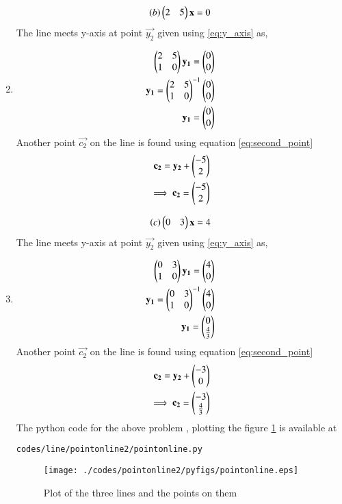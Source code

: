 \begin{enumerate}[label=\thesection.\arabic*.,ref=\thesection.\theenumi]
\begin{align}
\left(b\right)\begin{pmatrix}2&5\end{pmatrix}\mathbf{x}=0
\end{align}
The line meets y-axis at point $\vec{y_2}$ given using \ref{eq:y_axis} as,
\item 
\begin{align}
\begin{pmatrix}2&5\\1&0\end{pmatrix}\mathbf{y_1} =\begin{pmatrix}0\\0\end{pmatrix}
\\
\mathbf{y_1}={\begin{pmatrix}2&5\\1&0\end{pmatrix}}^{-1}\begin{pmatrix}0\\0\end{pmatrix}
\\
\mathbf{y_1}=\begin{pmatrix}0\\0\end{pmatrix}
\end{align}
Another point $\vec{c_2}$ on the line is found using equation \ref{eq:second_point}
\begin{align}
\mathbf{c_2} = \mathbf{y_2} + \begin{pmatrix}-5\\2\end{pmatrix}
\\
\implies \mathbf{c_2} = \begin{pmatrix}-5\\2\end{pmatrix}
\end{align}

\begin{align}
\left(c\right)\begin{pmatrix}0&3\end{pmatrix}\mathbf{x}=4
\end{align}
The line meets y-axis at point $\vec{y_2}$ given using \ref{eq:y_axis} as,
\item 
\begin{align}
\begin{pmatrix}0&3\\1&0\end{pmatrix}\mathbf{y_1} =\begin{pmatrix}4\\0\end{pmatrix}
\\
\mathbf{y_1}={\begin{pmatrix}0&3\\1&0\end{pmatrix}}^{-1}\begin{pmatrix}4\\0\end{pmatrix}
\\
\mathbf{y_1}=\begin{pmatrix}0\\\frac{4}{3}\end{pmatrix}
\end{align}
Another point $\vec{c_2}$ on the line is found using equation \ref{eq:second_point}
\begin{align}
\mathbf{c_2} = \mathbf{y_2} + \begin{pmatrix}-3\\0\end{pmatrix}
\\
\implies \mathbf{c_2} = \begin{pmatrix}-3\\\frac{4}{3}\end{pmatrix}
\end{align}
The python code for the above problem , plotting the figure \ref{fig:three_lines} is available at 
\begin{lstlisting}
codes/line/pointonline2/pointonline.py
\end{lstlisting}
\begin{figure}[!ht]
\centering
\texttt{[image: ./codes/pointonline2/pyfigs/pointonline.eps]}
\caption{Plot of the three lines and the points on them }
\label{fig:three_lines}
\end{figure}

\end{enumerate}
